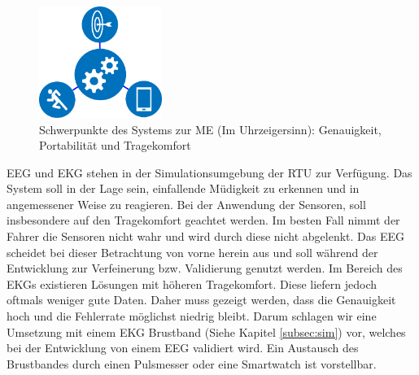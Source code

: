 {\begin{figure}[h] 
  \begin{center}
    \includegraphics[width=4cm]{img/all}
    \caption{Schwerpunkte des Systems zur \acl{ME} (Im Uhrzeigersinn): Genauigkeit, Portabilität und Tragekomfort}
    \label{fig:emphasis}
  \end{center}
\end{figure}

EEG und EKG stehen in der Simulationsumgebung der \acl{RTU} zur Verfügung. Das System soll in der Lage sein, einfallende Müdigkeit zu erkennen und in angemessener Weise zu reagieren. Bei der Anwendung der Sensoren, soll insbesondere auf den Tragekomfort geachtet werden. Im besten Fall nimmt der Fahrer die Sensoren nicht wahr und wird durch diese nicht abgelenkt. Das EEG scheidet bei dieser Betrachtung von vorne herein aus und soll während der Entwicklung zur Verfeinerung bzw. Validierung genutzt werden. Im Bereich des EKGs existieren Lösungen mit höheren Tragekomfort. Diese liefern jedoch oftmals weniger gute Daten. Daher muss gezeigt werden, dass die Genauigkeit hoch und die Fehlerrate möglichst niedrig bleibt. 
Darum schlagen wir eine Umsetzung mit einem EKG Brustband (Siehe Kapitel \ref{subsec:sim}) vor, welches bei der Entwicklung von einem EEG validiert wird. Ein Austausch des Brustbandes durch einen Pulsmesser oder eine Smartwatch ist vorstellbar.\\

}
